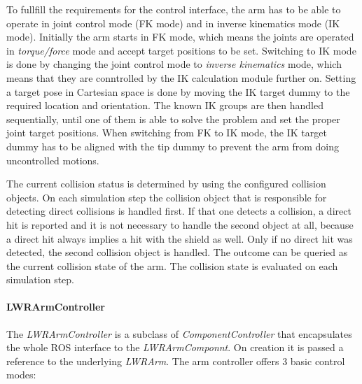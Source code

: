 To fullfill the requirements for the control interface, the arm has to be able to operate in joint control mode (FK mode) and in inverse kinematics mode (IK mode). Initially the arm starts in FK mode, which means the joints are operated in \emph{torque/force} mode and accept target positions to be set. Switching to IK mode is done by changing the joint control mode to \emph{inverse kinematics} mode, which means that they are conntrolled by the IK calculation module further on. Setting a target pose in Cartesian space is done by moving the IK target dummy to the required location and orientation. The known IK groups are then handled sequentially, until one of them is able to solve the problem and set the proper joint target positions. When switching from FK to IK mode, the IK target dummy has to be aligned with the tip dummy to prevent the arm from doing uncontrolled motions.

The current collision status is determined by using the configured collision objects. On each simulation step the collision object that is responsible for detecting direct collisions is handled first. If that one detects a collision, a direct hit is reported and it is not necessary to handle the second object at all, because a direct hit always implies a hit with the shield as well. Only if no direct hit was detected, the second collision object is handled. The outcome can be queried as the current collision state of the arm. The collision state is evaluated on each simulation step.

\paragraph{LWRArmController}

The \emph{LWRArmController} is a subclass of \emph{ComponentController} that encapsulates the whole ROS interface to the \emph{LWRArmComponnt}. On creation it is passed a reference to the underlying \emph{LWRArm}. The arm controller offers 3 basic control modes:

